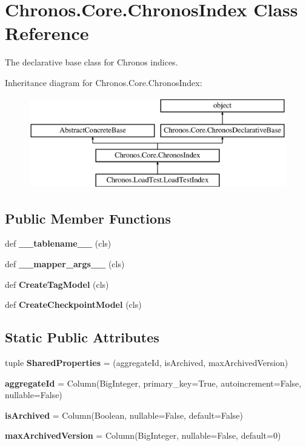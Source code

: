 \hypertarget{classChronos_1_1Core_1_1ChronosIndex}{}\section{Chronos.\+Core.\+Chronos\+Index Class Reference}
\label{classChronos_1_1Core_1_1ChronosIndex}


The declarative base class for Chronos indices.  


Inheritance diagram for Chronos.\+Core.\+Chronos\+Index\+:\begin{figure}[H]
\begin{center}
\leavevmode
\includegraphics[height=4.000000cm]{classChronos_1_1Core_1_1ChronosIndex}
\end{center}
\end{figure}
\subsection*{Public Member Functions}
\begin{DoxyCompactItemize}
\item 
def {\bfseries \+\_\+\+\_\+tablename\+\_\+\+\_\+} (cls)
\item 
def {\bfseries \+\_\+\+\_\+mapper\+\_\+args\+\_\+\+\_\+} (cls)
\item 
def {\bfseries Create\+Tag\+Model} (cls)
\item 
def {\bfseries Create\+Checkpoint\+Model} (cls)
\end{DoxyCompactItemize}
\subsection*{Static Public Attributes}
\begin{DoxyCompactItemize}
\item 
tuple {\bfseries Shared\+Properties} = (\textquotesingle{}aggregate\+Id\textquotesingle{}, \textquotesingle{}is\+Archived\textquotesingle{}, \textquotesingle{}max\+Archived\+Version\textquotesingle{})
\item 
{\bfseries aggregate\+Id} = Column(Big\+Integer, primary\+\_\+key=True, autoincrement=False, nullable=False)
\item 
{\bfseries is\+Archived} = Column(Boolean, nullable=False, default=False)
\item 
{\bfseries max\+Archived\+Version} = Column(Big\+Integer, nullable=False, default=0)
\end{DoxyCompactItemize}


